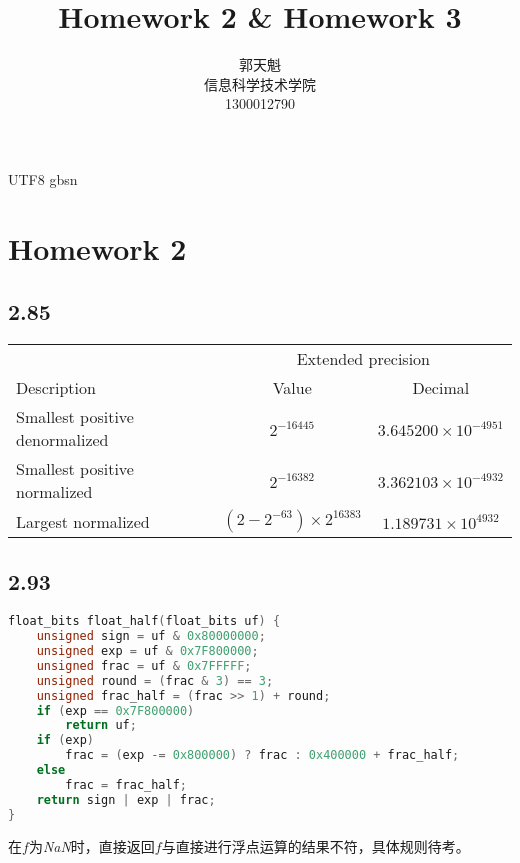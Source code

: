 \documentclass {article}
\begin{document}
  \begin {CJK*} {UTF8} {gbsn}
    \title {\textbf {\Huge Homework 2 \& Homework 3}}
	\author {郭天魁 \\ 信息科学技术学院 \\ 1300012790}

	\maketitle

	\section{Homework 2}
	  \subsection{2.85}
	    \begin{table}[h]
		  \begin{tabular}{lcc}
			                                 & \multicolumn{2}{c}{Extended precision}                      \\ \cline{2-3} 
			  Description                    & Value                         & Decimal                     \\ \hline
			  Smallest positive denormalized & $2^{-16445}$                  & $3.645200\times 10^{-4951}$ \\
			  Smallest positive normalized   & $2^{-16382}$                  & $3.362103\times 10^{-4932}$ \\
			  Largest normalized             & $(2-2^{-63})\times 2^{16383}$ & $1.189731\times 10^{4932}$ 
		  \end{tabular}
	    \end{table}

	  \subsection{2.93}
	    \begin{lstlisting}[language=C]
float_bits float_half(float_bits uf) {
	unsigned sign = uf & 0x80000000;
	unsigned exp = uf & 0x7F800000;
	unsigned frac = uf & 0x7FFFFF;
	unsigned round = (frac & 3) == 3;
	unsigned frac_half = (frac >> 1) + round;
	if (exp == 0x7F800000)
		return uf;
	if (exp)
		frac = (exp -= 0x800000) ? frac : 0x400000 + frac_half;
	else
		frac = frac_half;
	return sign | exp | frac;
}
        \end{lstlisting}
		在$f$为\textit{NaN}时，直接返回$f$与直接进行浮点运算的结果不符，具体规则待考。\\


\end{CJK*}
\end{document}
